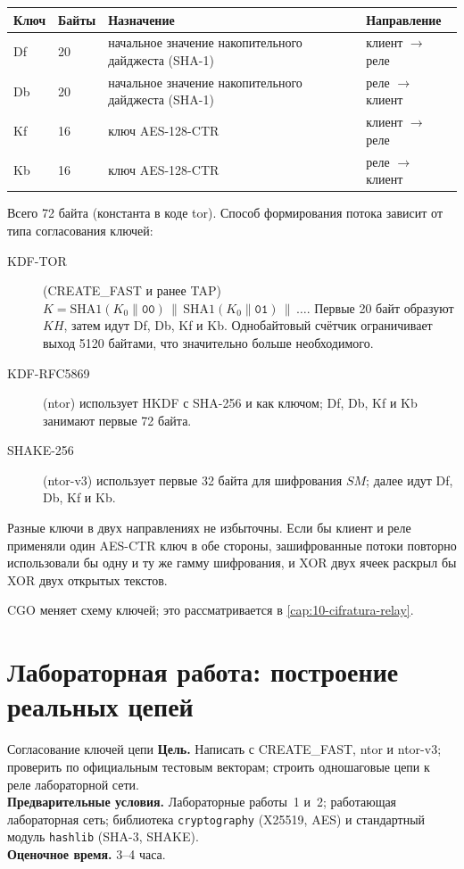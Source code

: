 \begin{center}
\setlength{\tabcolsep}{4pt}
\begin{tabular}{llll}
\toprule
Ключ & Байты & Назначение & Направление \\
\midrule
Df & 20 & начальное значение накопительного дайджеста (SHA-1) & клиент $\to$ реле \\
Db & 20 & начальное значение накопительного дайджеста (SHA-1) & реле $\to$ клиент \\
Kf & 16 & ключ AES-128-CTR & клиент $\to$ реле \\
Kb & 16 & ключ AES-128-CTR & реле $\to$ клиент \\
\bottomrule
\end{tabular}
\end{center}

Всего 72 байта (константа  в коде tor). Способ формирования потока зависит от типа согласования ключей:
\begin{description}
  \item[KDF-TOR] (CREATE\_FAST и ранее TAP) $K = \mathrm{SHA1}(K_0 \| \texttt{00}) \,\|\, \mathrm{SHA1}(K_0 \| \texttt{01}) \,\|\, \ldots$. Первые 20 байт образуют $KH$, затем идут Df, Db, Kf и Kb. Однобайтовый счётчик ограничивает выход 5120 байтами, что значительно больше необходимого.
  \item[KDF-RFC5869] (ntor) использует HKDF с SHA-256 и  как ключом; Df, Db, Kf и Kb занимают первые 72 байта.
  \item[SHAKE-256] (ntor-v3) использует первые 32 байта для шифрования $SM$; далее идут Df, Db, Kf и Kb.
\end{description}

Разные ключи в двух направлениях не избыточны. Если бы клиент и реле применяли один AES-CTR ключ в обе стороны, зашифрованные потоки повторно использовали бы одну и ту же гамму шифрования, и XOR двух ячеек раскрыл бы XOR двух открытых текстов.

CGO меняет схему ключей; это рассматривается в \cref{cap:10-cifratura-relay}.

\section{Лабораторная работа: построение реальных цепей}\label{sec:lab-circuiti}

\begin{laboratorio}[3]{Согласование ключей цепи}
\textbf{Цель.} Написать  с CREATE\_FAST, ntor и ntor-v3; проверить по официальным тестовым векторам; строить одношаговые цепи к реле лабораторной сети.\\
\textbf{Предварительные условия.} Лабораторные работы~1 и~2; работающая лабораторная сеть; библиотека \texttt{cryptography} (X25519, AES) и стандартный модуль \texttt{hashlib} (SHA-3, SHAKE).\\
\textbf{Оценочное время.} 3--4 часа.
\end{laboratorio}

